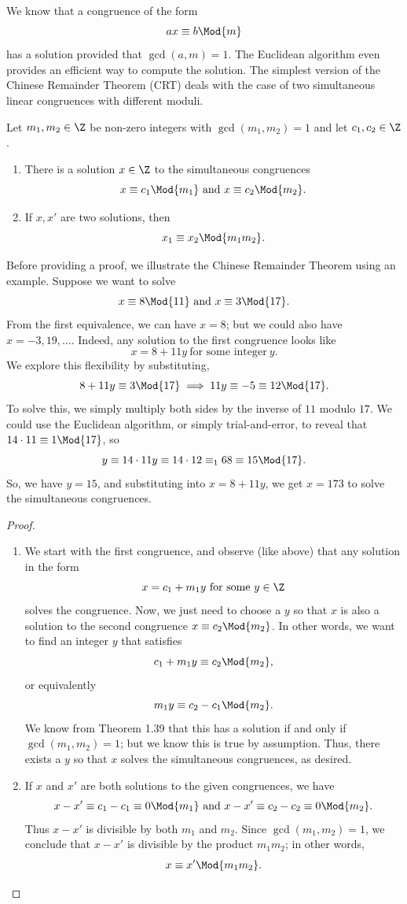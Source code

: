 \documentclass[math1530-lecture-notes]{subfiles}
\begin{document}
We know that a congruence of the form \[
  ax\equiv b\Mod{m}
\] has a solution provided that $\gcd{(a,m)}=1$. The Euclidean algorithm even provides an efficient
way to compute the solution. The simplest version of the Chinese Remainder Theorem (CRT) deals with
the case of two simultaneous linear congruences with different moduli.

\begin{theorem}{}
  Let $m_1,m_2\in \Z$ be non-zero integers with $\gcd{(m_1,m_2)}=1$ and let $c_1,c_2\in \Z$.
  \begin{enumerate}
    \item There is a solution $x\in \Z$ to the simultaneous congruences \[
          x\equiv c_1\Mod{m_1}~\text{and}~x\equiv c_2\Mod{m_2}
      .\] 
    \item If $x,x'$ are two solutions, then \[
        x_1\equiv x_2\Mod{m_1m_2}
    .\] 
  \end{enumerate}
\end{theorem}
Before providing a proof, we illustrate the Chinese Remainder Theorem using an example. Suppose we
want to solve \[
  x\equiv 8\Mod{11}~\text{and}~x\equiv 3\Mod{17}
.\] From the first equivalence, we can have $x=8$; but we could also have $x=-3,19,\ldots$. Indeed,
any solution to the first congruence looks like \[
  x=8+11y~\text{for some integer}~y
.\] We explore this flexibility by substituting, \[
  8+11y\equiv 3\Mod{17}\implies 11y\equiv-5\equiv 12\Mod{17}
.\] To solve this, we simply multiply both sides by the inverse of $11$ modulo $17$. We could use
the Euclidean algorithm, or simply trial-and-error, to reveal that $14\cdot 11\equiv 1\Mod{17}$, so
\[
  y\equiv 14\cdot 11y\equiv 14\cdot 12\equiv_168\equiv 15\Mod{17}
.\] So, we have $y=15$, and substituting into $x=8+11y$, we get $x=173$ to solve the simultaneous
congruences.
\begin{proof}[Proof]
  \begin{enumerate}
    \item We start with the first congruence, and observe (like above) that any solution in the form
      \[
        x=c_1+m_1y~\text{for some}~y\in \Z
      \] solves the congruence. Now, we just need to choose a $y$ so that $x$ is also a solution to
      the second congruence $x\equiv c_2\Mod{m_2}$. In other words, we want to find an integer $y$
      that satisfies \[
        c_1+m_1y\equiv c_2\Mod{m_2}
      ,\] or equivalently \[
        m_1y\equiv c_2-c_1\Mod{m_2}
      .\] We know from Theorem 1.39 that this has a solution if and only if $\gcd{(m_1,m_2)}=1$; but
      we know this is true by assumption. Thus, there exists a $y$ so that $x$ solves the
      simultaneous congruences, as desired.
    \item If $x$ and $x'$ are both solutions to the given congruences, we have \[
      x-x'\equiv c_1-c_1\equiv 0\Mod{m_1}~\text{and}~x-x'\equiv c_2-c_2\equiv 0\Mod{m_2}
    .\] Thus $x-x'$ is divisible by both $m_1$ and $m_2$. Since $\gcd{(m_1,m_2)}=1$, we conclude
    that $x-x'$ is divisible by the product $m_1m_2$; in other words, \[
      x\equiv x'\Mod{m_1m_2}
    .\] 
  \end{enumerate}
\end{proof}
\end{document}
